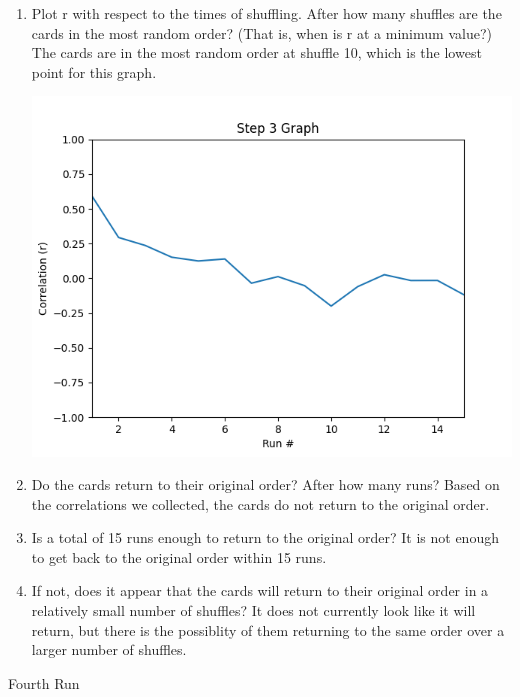 \documentclass[12pt]{article}
\begin{document}
    \begin{enumerate}
        \item Plot r with respect to the times of shuffling. After how many shuffles are the cards 
        in the most random order? (That is, when is r at a minimum value?)
        \subitem The cards are in the most random order at shuffle 10, which is the lowest point for this graph.\\
        \begin{minipage}[t]{\linewidth}
            \centering
            {
              \includegraphics[width=.7\linewidth]{Figure_3.png}
            }
            \medskip       
        \end{minipage}
        \item Do the cards return to their original order?  After how many runs?
        \subitem Based on the correlations we collected, the cards do not return to the original order.
        \item Is a total of 15 runs enough to return to the original order?
        \subitem It is not enough to get back to the original order within 15 runs.
        \item If not, does it appear that the cards will return to their original order in a relatively 
        small number of shuffles?
        \subitem It does not currently look like it will return, 
                 but there is the possiblity of them returning to the same order over a larger number of shuffles.
    \end{enumerate}
    \newpage
    \begin{center}
        \small Fourth Run
    \end{center}
\end{document}
